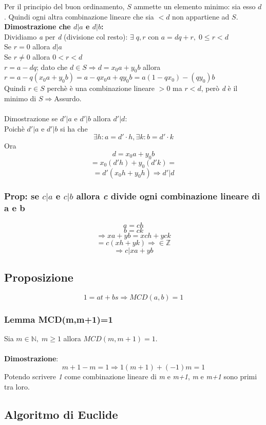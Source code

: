 Per il principio del buon ordinamento, $S$ ammette un elemento minimo: sia esso $d$.
Quindi ogni altra combinazione lineare che sia $<d$ non appartiene ad $S$.
\\\textbf{Dimostrazione che \(d|a\) e \(d|b\):}
\\
Dividiamo \textit{a} per \textit{d} (divisione col resto):
\(\exists\; q,r\) con \(a=dq+r,\; 0\leq r<d\)
\\
Se \(r=0\) allora \(d|a\)
\\
Se \(r\neq 0\) allora \(0<r<d\)
\\
\(r=a-dq\); dato che \(d\in S\Rightarrow d=x_0a+y_0b\) allora\\ \(r=a-q(x_0a+y_0b)=a-qx_0a+qy_0b=a(1-qx_0)-(qy_0)b\)
\\
Quindi \(r\in S\) perchè è una combinazione lineare \(>0\) ma \(r<d\), però \textit{d} è il minimo di \(S\Rightarrow\)Assurdo.
\\\\
Dimostrazione se \(d'|a\) e \(d'|b\) allora \(d'|d\):
\\
Poichè \(d'|a\) e \(d'|b\) si ha che
\[\exists h:a=d'\cdot h, \exists k:b=d'\cdot k\]
Ora \[d=x_0a+y_0b\]
\[=x_0(d'h)+y_0(d'k)=\]
\[=d'(x_0h+y_0h)\Rightarrow d'|d\]

\subsubsection{Prop: se \(c|a\) e \(c|b\) allora \textit{c} divide ogni combinazione lineare di a e b}
\[a=ch\]
\[b=ck\]
\[\Rightarrow xa+yb=xch+yck\]
\[=c(xh+yk)\Rightarrow\in\mathbb{Z}\]
\[\Rightarrow c|xa+yb\]

\subsection{Proposizione}
\[1=at+bs\Rightarrow MCD(a,b)=1\]

\subsubsection{Lemma MCD(m,m+1)=1}
Sia \(m\in\mathbb{N},\; m\geq 1\) allora \(MCD(m,m+1)=1\).
\\\\
\textbf{Dimostrazione}: \[m+1-m=1\Rightarrow 1(m+1)+(-1)m=1\]
Potendo scrivere \textit{1} come combinazione lineare di \textit{m} e \textit{m+1}, \textit{m} e \textit{m+1} sono primi tra loro.

\subsection{Algoritmo di Euclide}


